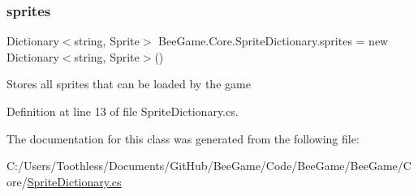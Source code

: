 \subsubsection{\texorpdfstring{sprites}{sprites}}
{\footnotesize\ttfamily Dictionary$<$string, Sprite$>$ Bee\+Game.\+Core.\+Sprite\+Dictionary.\+sprites = new Dictionary$<$string, Sprite$>$()\hspace{0.3cm}{\ttfamily [static]}}



Stores all sprites that can be loaded by the game 



Definition at line 13 of file Sprite\+Dictionary.\+cs.



The documentation for this class was generated from the following file\+:\begin{DoxyCompactItemize}
\item 
C\+:/\+Users/\+Toothless/\+Documents/\+Git\+Hub/\+Bee\+Game/\+Code/\+Bee\+Game/\+Bee\+Game/\+Core/\hyperlink{_sprite_dictionary_8cs}{Sprite\+Dictionary.\+cs}\end{DoxyCompactItemize}
